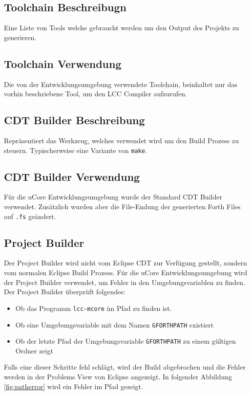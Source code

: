 \subsection{Toolchain Beschreibugn}
Eine Liste von Tools welche gebraucht werden um den Output des Projekts zu generieren. 

\subsection{Toolchain Verwendung}
Die von der Entwicklungsumgebung verwendete Toolchain, beinhaltet nur das vorhin beschriebene Tool, um den LCC Compiler aufzurufen.

\subsection{CDT Builder Beschreibung}
Repräsentiert das Werkzeug, welches verwendet wird um den Build Prozess zu steuern. Typischerweise eine Variante von \verb!make!. 

\subsection{CDT Builder Verwendung}
Für die uCore Entwicklungsumgebung wurde der Standard CDT Builder verwendet. Zusätzlich wurden aber die File-Endung der generierten Forth Files auf \verb!.fs! geändert.

\subsection{Project Builder}
Der Project Builder wird nicht vom Eclipse CDT zur Verfügung gestellt, sondern vom normalen Eclipse Build Prozess. Für die uCore Entwicklungsumgebung wird der Project Builder verwendet, um Fehler in den Umgebungsvariablen zu finden. Der Project Builder überprüft folgendes:
%
\begin{itemize}
  \item Ob das Programm \verb!lcc-mcore! im Pfad zu finden ist.
  \item Ob eine Umgebungsvariable mit dem Namen \verb!GFORTHPATH! existiert
  \item Ob der letzte Pfad der Umgebungsvariable \verb!GFORTHPATH! zu einem gültigen Ordner zeigt
\end{itemize}
%
Falls eine dieser Schritte fehl schlägt, wird der Build abgebrochen und die Fehler werden in der Problems View von Eclipse angezeigt. In folgender Abbildung \ref{fig:patherror} wird ein Fehler im Pfad gezeigt.

